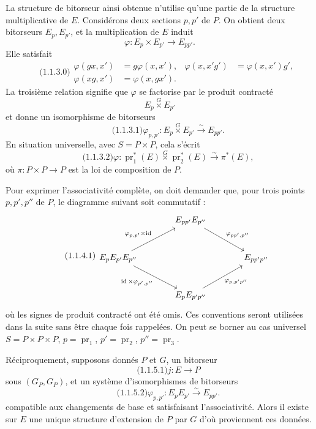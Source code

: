 \documentclass[11pt]{article}
\providecommand{\pr}{\operatorname{pr}}
\providecommand{\id}{\operatorname{id}}
\begin{document}
La structure de bitorseur ainsi obtenue n'utilise qu'une partie de la structure multiplicative de \(E\).  Considérons deux sections \(p,p'\) de \(P\).  On obtient deux bitorseurs \(E_p,E_{p'}\), et la multiplication de \(E\) induit
\[
  \varphi:E_p\times E_{p'}\longrightarrow E_{pp'}.
\]
Elle satisfait
\begin{equation}\qquad\text{(1.1.3.0)}
\begin{aligned}
 \varphi(gx,x')&=g\varphi(x,x'),&
 \varphi(x,x'g')&=\varphi(x,x')g',\\
 \varphi(xg,x')&=\varphi(x,gx').
\end{aligned}
\end{equation}
La troisième relation signifie que \(\varphi\) se factorise par le produit contracté
\[
  E_p\overset{G}{\times}E_{p'}
\]
et donne un isomorphisme de bitorseurs
\begin{equation}\qquad\text{(1.1.3.1)}
  \varphi_{p,p'}:E_p\overset{G}{\times}E_{p'}\xrightarrow{\sim}E_{pp'}.
\end{equation}
En situation universelle, avec \(S=P\times P\), cela s'écrit
\begin{equation}\qquad\text{(1.1.3.2)}
  \varphi:\pr_1^*(E)\overset{G}{\times}\pr_2^*(E)
     \xrightarrow{\sim}\pi^*(E),
\end{equation}
où \(\pi:P\times P\to P\) est la loi de composition de \(P\).

Pour exprimer l'associativité complète, on doit demander que, pour trois points \(p,p',p''\) de \(P\), le diagramme suivant soit commutatif :
\begin{equation}\qquad\text{(1.1.4.1)}
\begin{tikzcd}[column sep=large,row sep=large]
& E_{pp'}E_{p''}\arrow[dr,"\varphi_{pp',p''}"]&\\
E_pE_{p'}E_{p''}\arrow[ur,"\varphi_{p,p'}\times\id"]\arrow[dr,"\id\times\varphi_{p',p''}"']&&E_{pp'p''}\\
& E_pE_{p'p''}\arrow[ur,"\varphi_{p,p'p''}"']&
\end{tikzcd}
\end{equation}
où les signes de produit contracté ont été omis.  Ces conventions seront utilisées dans la suite sans être chaque fois rappelées.  On peut se borner au cas universel \(S=P\times P\times P\), \(p=\pr_1\), \(p'=\pr_2\), \(p''=\pr_3\).

Réciproquement, supposons donnés \(P\) et \(G\), un bitorseur
\begin{equation}\qquad\text{(1.1.5.1)}
  j:E\longrightarrow P
\end{equation}
sous \((G_P,G_P)\), et un système d'isomorphismes de bitorseurs
\begin{equation}\qquad\text{(1.1.5.2)}
  \varphi_{p,p'}:E_pE_{p'}\xrightarrow{\sim}E_{pp'}.
\end{equation}
compatible aux changements de base et satisfaisant l'associativité.  Alors il existe sur \(E\) une unique structure d'extension de \(P\) par \(G\) d'où proviennent ces données.
\end{document}
